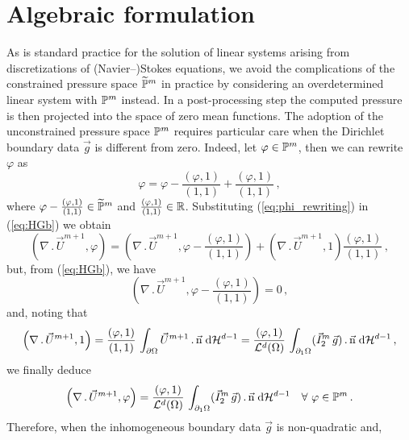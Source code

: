 \section{Algebraic formulation}\label{sec:stokes_algebraic_system}
As is standard practice for the solution of linear systems arising from
discretizations of (Navier--)Stokes equations, we avoid the complications of the
constrained pressure space $\widetilde{\mathbb{P}}^m$ in practice by considering an
overdetermined linear system with $\mathbb{P}^m$ instead. In a post-processing step
the computed pressure is then projected into the space of zero mean
functions. The adoption of the unconstrained pressure space $\mathbb{P}^m$
requires particular care when the Dirichlet boundary data $\vec g$ is different
from zero. Indeed, let $\varphi \in \mathbb{P}^m$, then we can rewrite $\varphi$ as
\begin{equation}\label{eq:phi_rewriting}
\varphi=\varphi-\frac{\left(\varphi,1\right)}{\left(1,1\right)}
+\frac{\left(\varphi,1\right)}{\left(1,1\right)}\,,
\end{equation}
where $\varphi-\frac{(\varphi,1)}{(1,1)}\in\widetilde{\mathbb{P}}^m$ and
$\frac{(\varphi,1)}{(1,1)}\in\mathbb R$. Substituting (\ref{eq:phi_rewriting}) in
(\ref{eq:HGb}) we obtain
\begin{equation}
\left(\nabla\,.\,\vec U^{m+1}, \varphi\right)  =
\left(\nabla\,.\,\vec U^{m+1},
\varphi-\frac{\left(\varphi,1\right)}{\left(1,1\right)}\right) +
\left(\nabla\,.\,\vec U^{m+1},1\right)
\frac{\left(\varphi,1\right)}{\left(1,1\right)}\,,
\end{equation}
but, from (\ref{eq:HGb}), we have
\begin{equation}
\left(\nabla\,.\,\vec U^{m+1},
\varphi-\frac{\left(\varphi,1\right)}{\left(1,1\right)}\right) = 0\,,
\end{equation}
and, noting that
\begin{equation}
\left(\nabla\,.\,\vec U^{m+1}, 1\right)=
\frac{\left(\varphi,1\right)}{\left(1,1\right)}\, \int_{\partial\Omega}
\vec U^{m+1}\,.\, \vec{\rm n} \;{\rm d}{\cal H}^{d-1}=
\frac{\left(\varphi,1\right)}{\mathcal{L}^d(\Omega)}\, \int_{\partial_1\Omega}
(\vec I^m_2\,\vec g) \,.\, \vec{\rm n} \;{\rm d}{\cal H}^{d-1}\,,
\end{equation}
we finally deduce
\begin{equation} \label{eq:LAb}
 \left(\nabla\,.\,\vec U^{m+1}, \varphi\right) =
 \frac{\left(\varphi, 1\right)}{\mathcal{L}^d(\Omega)}\, \int_{\partial_1\Omega}
(\vec I^m_2\,\vec g) \,.\, \vec{\rm n} \;{\rm d}{\cal H}^{d-1} \quad \forall\ \varphi \in
\mathbb{P}^m\,.
\end{equation}
Therefore, when the inhomogeneous boundary data $\vec g$ is non-quadratic and,
